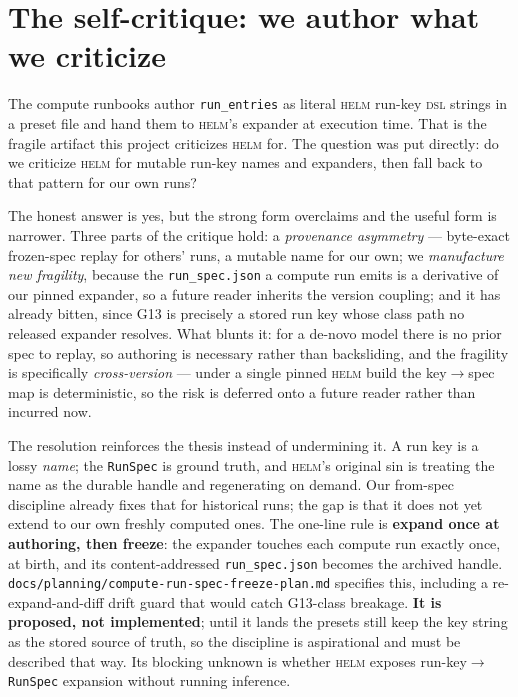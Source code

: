 \documentclass[11pt]{report}
\newcommand{\code}[1]{\texttt{#1}}
\newcommand{\file}[1]{\texttt{#1}}
\begin{document}
\section{The self-critique: we author what we criticize}
\label{sec:freeze-critique}

The compute runbooks author \code{run\_entries} as literal \textsc{helm} run-key
\textsc{dsl} strings in a preset file and hand them to \textsc{helm}'s expander at
execution time. That is the fragile artifact this project criticizes \textsc{helm}
for. The question was put directly: do we criticize \textsc{helm} for mutable
run-key names and expanders, then fall back to that pattern for our own runs?

The honest answer is yes, but the strong form overclaims and the useful form is
narrower. Three parts of the critique hold: a \emph{provenance asymmetry} ---
byte-exact frozen-spec replay for others' runs, a mutable name for our own; we
\emph{manufacture new fragility}, because the \code{run\_spec.json} a compute run
emits is a derivative of our pinned expander, so a future reader inherits the
version coupling; and it has already bitten, since G13 is precisely a stored run key
whose class path no released expander resolves. What blunts it: for a de-novo model
there is no prior spec to replay, so authoring is necessary rather than backsliding,
and the fragility is specifically \emph{cross-version} --- under a single pinned
\textsc{helm} build the key$\rightarrow$spec map is deterministic, so the risk is
deferred onto a future reader rather than incurred now.

The resolution reinforces the thesis instead of undermining it. A run key is a lossy
\emph{name}; the \code{RunSpec} is ground truth, and \textsc{helm}'s original sin is
treating the name as the durable handle and regenerating on demand. Our from-spec
discipline already fixes that for historical runs; the gap is that it does not yet
extend to our own freshly computed ones. The one-line rule is \textbf{expand once at
authoring, then freeze}: the expander touches each compute run exactly once, at
birth, and its content-addressed \code{run\_spec.json} becomes the archived handle.
\file{docs/planning/compute-run-spec-freeze-plan.md} specifies this, including a
re-expand-and-diff drift guard that would catch G13-class breakage. \textbf{It is
proposed, not implemented}; until it lands the presets still keep the key string as
the stored source of truth, so the discipline is aspirational and must be described
that way. Its blocking unknown is whether \textsc{helm} exposes
run-key$\rightarrow$\code{RunSpec} expansion without running inference.
\end{document}
